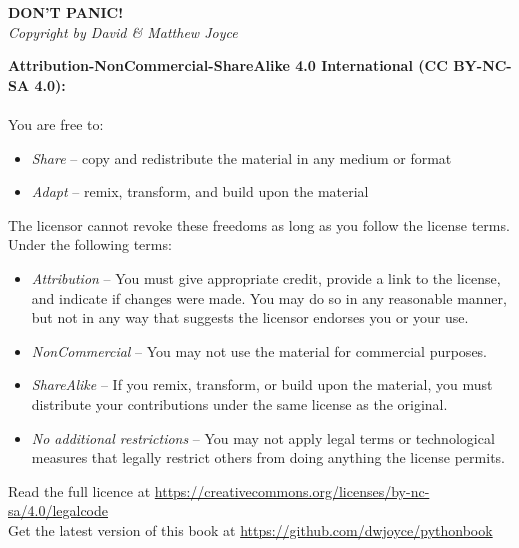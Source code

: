 {
\vspace*{\fill}
\begin{center}
\textbf{\fontsize{50}{60}\selectfont DON'T PANIC!}\\
\vspace{30pt}
\textit{Copyright \textcopyright{} by David \& Matthew Joyce}\\
\vspace{20pt}
\end{center}
{\bfseries Attribution-NonCommercial-ShareAlike 4.0 International (CC BY-NC-SA 4.0):}\\~\\
\footnotesize You are free to:
\begin{itemize}
\item \textit{Share} -- copy and redistribute the material in any medium or format\\
\item \textit{Adapt} -- remix, transform, and build upon the material\\
\end{itemize}
The licensor cannot revoke these freedoms as long as you follow the license terms.\\
Under the following terms:
\begin{itemize}
\item \textit{Attribution} -- You must give appropriate credit, provide a link to the license, and indicate if changes were made. You may do so in any reasonable manner, but not in any way that suggests the licensor endorses you or your use.\\
\item \textit{NonCommercial} -- You may not use the material for commercial purposes.\\
\item \textit{ShareAlike} -- If you remix, transform, or build upon the material, you must distribute your contributions under the same license as the original.\\
\item \textit{No additional restrictions} -- You may not apply legal terms or technological measures that legally restrict others from doing anything the license permits.\\
\end{itemize}
Read the full licence at \url{https://creativecommons.org/licenses/by-nc-sa/4.0/legalcode}\\
Get the latest version of this book at \url{https://github.com/dwjoyce/pythonbook}\\
\vspace*{\fill}
}
